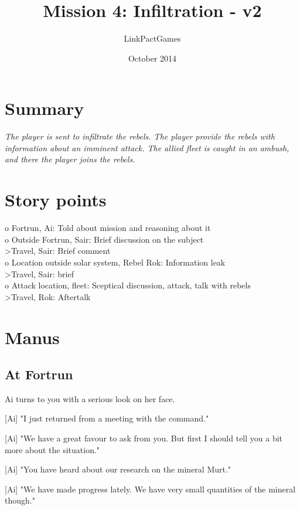 \documentclass[a4paper,12pt]{article}
\begin{document}
\title{Mission 4: Infiltration - v2}
\author{LinkPactGames}
\date{October 2014}
\maketitle

\section{Summary}

\textit{The player is sent to infiltrate the rebels. The player provide
the rebels with information about an imminent attack. The allied
fleet is caught in an ambush, and there the player joins the rebels.}

\section{Story points}

o Fortrun, Ai: Told about mission and reasoning about it\\
o Outside Fortrun, Sair: Brief discussion on the subject\\
\textgreater Travel, Sair: Brief comment\\
o Location outside solar system, Rebel Rok: Information leak\\
\textgreater Travel, Sair: brief\\
o Attack location, fleet: Sceptical discussion, attack, talk with rebels\\
\textgreater Travel, Rok: Aftertalk

\section{Manus}

\subsection{At Fortrun}

Ai turns to you with a serious look on her face.

[Ai] "I just returned from a meeting with the command."

[Ai] "We have a great favour to ask from you. But first I should tell you a bit more
about the situation."

[Ai] "You have heard about our research on the mineral Murt." 

[Ai] "We have made progress lately. We have very small quantities of the mineral though."
\end{document}
